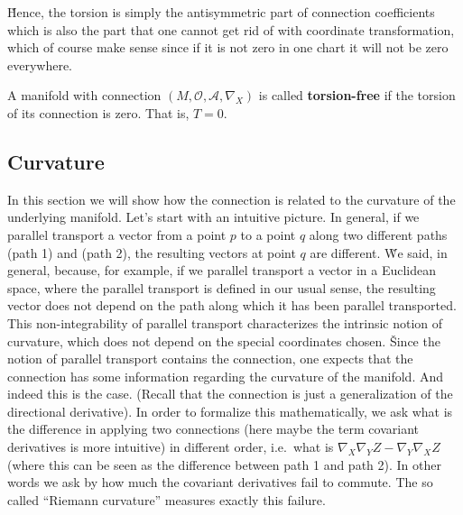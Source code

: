 \v

Hence, the torsion is simply the antisymmetric part of connection coefficients which is also the part that one cannot
get rid of with coordinate transformation, which of course make sense since if it is not zero in one chart it will
not be zero everywhere.

A manifold with connection $(M,\mathcal{O}, \mathscr{A},\nabla_X)$ is called \textbf{torsion-free} if the torsion of
its connection is zero. That is, $T = 0$.
\ed

\subsection{Curvature}

In this section we will show how the connection is related to the curvature of the underlying manifold. Let's start
with an intuitive picture. In general, if we parallel transport a vector from a point $p$ to a point $q$ along two
different paths (path 1) and (path 2), the resulting vectors at point $q$ are different. \v

We said, in general, because, for example, if we parallel transport a vector in a Euclidean space, where the parallel
transport is defined in our usual sense, the resulting vector does not depend on the path along which it has been
parallel transported. This non-integrability of parallel transport characterizes the intrinsic notion of curvature,
which does not depend on the special coordinates chosen. \v

Since the notion of parallel transport contains the connection, one expects that the connection has some information
regarding the curvature of the manifold. And indeed this is the case. (Recall that the connection is just a
generalization of the directional derivative). In order to formalize this mathematically, we ask what is the
difference in applying two connections (here maybe the term covariant derivatives is more intuitive) in different
order, i.e.\ what is $\nabla_X \nabla_Y Z - \nabla_Y \nabla_X Z$ (where this can be seen as the difference between path
1 and path 2). In other words we ask by how much the covariant derivatives fail to commute. The so called ``Riemann
curvature'' measures exactly this failure.

\vspace{-15pt}


\vspace{-15pt}

